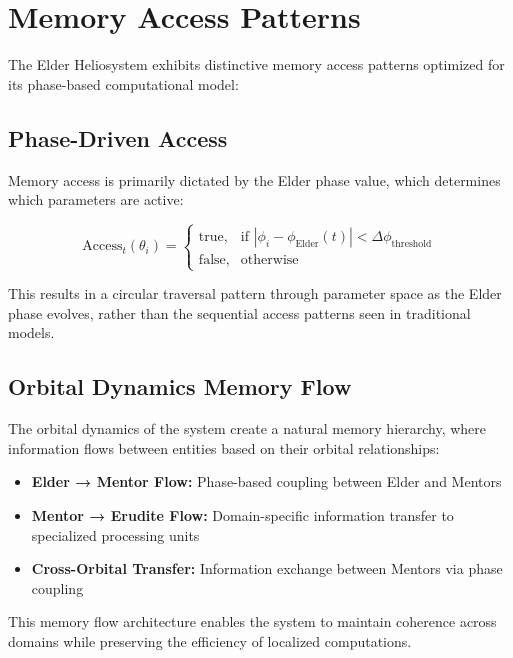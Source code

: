 \section{Memory Access Patterns}

The Elder Heliosystem exhibits distinctive memory access patterns optimized for its phase-based computational model:

\subsection{Phase-Driven Access}

Memory access is primarily dictated by the Elder phase value, which determines which parameters are active:

\begin{equation}
\text{Access}_t(\theta_i) = \begin{cases}
\text{true}, & \text{if } |\phi_i - \phi_{\text{Elder}}(t)| < \Delta\phi_{\text{threshold}} \\
\text{false}, & \text{otherwise}
\end{cases}
\end{equation}

This results in a circular traversal pattern through parameter space as the Elder phase evolves, rather than the sequential access patterns seen in traditional models.

\subsection{Orbital Dynamics Memory Flow}

The orbital dynamics of the system create a natural memory hierarchy, where information flows between entities based on their orbital relationships:

\begin{itemize}
    \item \textbf{Elder → Mentor Flow:} Phase-based coupling between Elder and Mentors
    \item \textbf{Mentor → Erudite Flow:} Domain-specific information transfer to specialized processing units
    \item \textbf{Cross-Orbital Transfer:} Information exchange between Mentors via phase coupling
\end{itemize}

This memory flow architecture enables the system to maintain coherence across domains while preserving the efficiency of localized computations.

